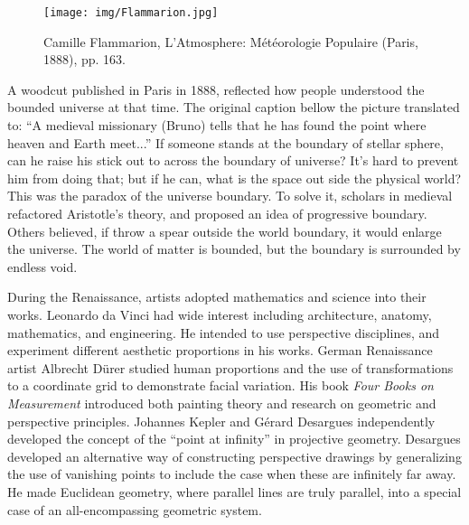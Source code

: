 \documentclass{article}
\begin{document}
\begin{figure}[htbp]
 \centering
 \texttt{[image: img/Flammarion.jpg]}
 \captionsetup{labelformat=empty}
 \caption{Camille Flammarion, L'Atmosphere: Météorologie Populaire (Paris, 1888), pp. 163.}
 \label{fig:Flamarion-woodcut}
\end{figure}




A woodcut published in Paris in 1888, reflected how people understood the bounded universe at that time. The original caption bellow the picture translated to: ``A medieval missionary (Bruno) tells that he has found the point where heaven and Earth meet...'' If someone stands at the boundary of stellar sphere, can he raise his stick out to across the boundary of universe? It's hard to prevent him from doing that; but if he can, what is the space out side the physical world? This was the paradox of the universe boundary. To solve it, scholars in medieval refactored Aristotle's theory, and proposed an idea of progressive boundary. Others believed, if throw a spear outside the world boundary, it would enlarge the universe. The world of matter is bounded, but the boundary is surrounded by endless void.

During the Renaissance, artists adopted mathematics and science into their works. Leonardo da Vinci had wide interest including architecture, anatomy, mathematics, and engineering. He intended to use perspective disciplines, and experiment different aesthetic proportions in his works. German Renaissance artist Albrecht Dürer studied human proportions and the use of transformations to a coordinate grid to demonstrate facial variation. His book {\em Four Books on Measurement} introduced both painting theory and research on geometric and perspective principles. Johannes Kepler and Gérard Desargues independently developed the concept of the ``point at infinity'' in projective geometry. Desargues developed an alternative way of constructing perspective drawings by generalizing the use of vanishing points to include the case when these are infinitely far away. He made Euclidean geometry, where parallel lines are truly parallel, into a special case of an all-encompassing geometric system.
\end{document}
